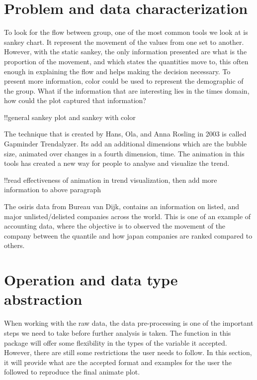 \hypertarget{problem-and-data-characterization}{%
\section{Problem and data characterization}\label{problem-and-data-characterization}}

To look for the flow between group, one of the most common tools we look at is sankey chart. It represent the movement of the values from one set to another. However, with the static sankey, the only information presented are what is the proportion of the movement, and which states the quantities move to, this often enough in explaining the flow and helps making the decision necessary. To present more information, color could be used to represent the demographic of the group. What if the information that are interesting lies in the times domain, how could the plot captured that information?

!!general sankey plot and sankey with color

The technique that is created by Hans, Ola, and Anna Rosling in 2003 is called Gapminder Trendalyzer. Its add an additional dimensions which are the bubble size, animated over changes in a fourth dimension, time. The animation in this tools has created a new way for people to analyse and visualize the trend.

!!read effectiveness of animation in trend visualization, then add more information to above paragraph

The osiris data from Bureau van Dijk, contains an information on listed, and major unlisted/delisted companies across the world. This is one of an example of accounting data, where the objective is to observed the movement of the company between the quantile and how japan companies are ranked compared to others.

\hypertarget{operation-and-data-type-abstraction}{%
\section{Operation and data type abstraction}\label{operation-and-data-type-abstraction}}

When working with the raw data, the data pre-processing is one of the important steps we need to take before further analysis is taken. The function in this package will offer some flexibility in the types of the variable it accepted. However, there are still some restrictions the user needs to follow. In this section, it will provide what are the accepted format and examples for the user the followed to reproduce the final animate plot.

